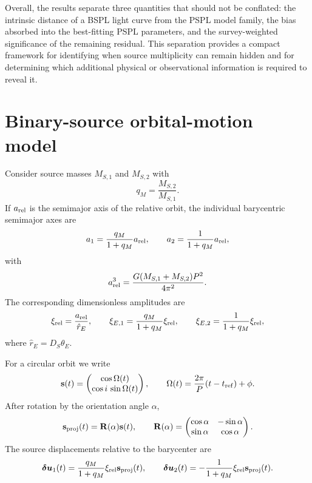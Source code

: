 \documentclass{article}
\begin{document}
Overall, the results separate three quantities that should not be
conflated: the intrinsic distance of a BSPL light curve from the PSPL
model family, the bias absorbed into the best-fitting PSPL parameters,
and the survey-weighted significance of the remaining residual. This
separation provides a compact framework for identifying when source
multiplicity can remain hidden and for determining which additional
physical or observational information is required to reveal it.

\appendix
\section{Binary-source orbital-motion model}
\label{app:bspl_formalism}

Consider source masses $M_{S,1}$ and $M_{S,2}$ with
\begin{equation}
q_M=\frac{M_{S,2}}{M_{S,1}}.
\end{equation}
If $a_{\rm rel}$ is the semimajor axis of the relative orbit, the
individual barycentric semimajor axes are
\begin{equation}
a_1=\frac{q_M}{1+q_M}a_{\rm rel},
\qquad
a_2=\frac{1}{1+q_M}a_{\rm rel},
\end{equation}
with
\begin{equation}
a_{\rm rel}^3
=
\frac{G(M_{S,1}+M_{S,2})P^2}{4\pi^2}.
\end{equation}
The corresponding dimensionless amplitudes are
\begin{equation}
\xi_{\rm rel}=\frac{a_{\rm rel}}{\hat r_E},
\qquad
\xi_{E,1}=\frac{q_M}{1+q_M}\xi_{\rm rel},
\qquad
\xi_{E,2}=\frac{1}{1+q_M}\xi_{\rm rel},
\end{equation}
where $\hat r_E=D_S\theta_E$.

For a circular orbit we write
\begin{equation}
\mathbf{s}(t)
=
\begin{pmatrix}
\cos\Omega(t)\\
\cos i\,\sin\Omega(t)
\end{pmatrix},
\qquad
\Omega(t)
=
\frac{2\pi}{P}(t-t_{\rm ref})+\phi.
\end{equation}
After rotation by the orientation angle $\alpha$,
\begin{equation}
\mathbf{s}_{\rm proj}(t)
=
\mathbf{R}(\alpha)\mathbf{s}(t),
\qquad
\mathbf{R}(\alpha)
=
\begin{pmatrix}
\cos\alpha & -\sin\alpha\\
\sin\alpha & \cos\alpha
\end{pmatrix}.
\end{equation}
The source displacements relative to the barycenter are
\begin{equation}
\boldsymbol{\delta u}_1(t)
=
\frac{q_M}{1+q_M}\xi_{\rm rel}\mathbf{s}_{\rm proj}(t),
\qquad
\boldsymbol{\delta u}_2(t)
=
-\frac{1}{1+q_M}\xi_{\rm rel}\mathbf{s}_{\rm proj}(t).
\end{equation}
\end{document}
